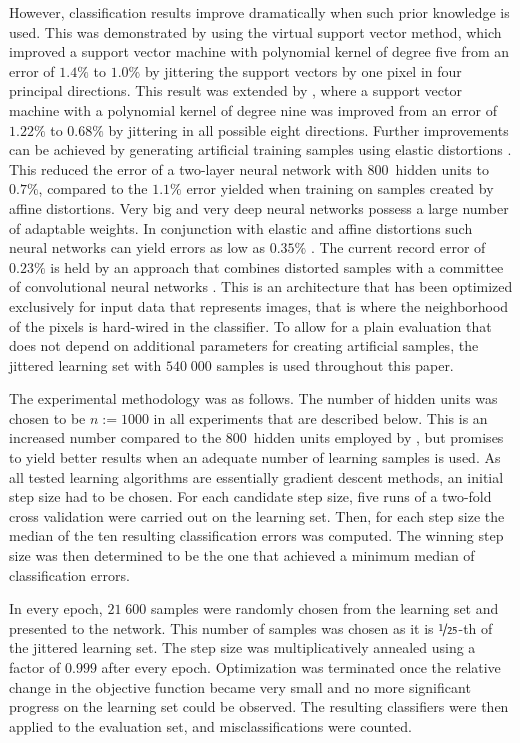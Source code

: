 \documentclass[twoside,11pt]{article}
\newcommand{\0}{\mathcal{O}}
\begin{document}
However, classification results improve dramatically when such prior knowledge is used.
This was demonstrated by \citet{Schoelkopf1997} using the virtual support vector method, which improved a support vector machine with polynomial kernel of degree five from an error of $1.4\%$ to $1.0\%$ by jittering the support vectors by one pixel in four principal directions.
This result was extended by \citet{DeCoste2002}, where a support vector machine with a polynomial kernel of degree nine was improved from an error of $1.22\%$ to $0.68\%$ by jittering in all possible eight directions.
Further improvements can be achieved by generating artificial training samples using elastic distortions \citep{Simard2003}.
This reduced the error of a two-layer neural network with $800$~hidden units to $0.7\%$, compared to the $1.1\%$ error yielded when training on samples created by affine distortions.
Very big and very deep neural networks possess a large number of adaptable weights.
In conjunction with elastic and affine distortions such neural networks can yield errors as low as $0.35\%$ \citep{Ciresan2010a}.
The current record error of $0.23\%$ is held by an approach that combines distorted samples with a committee of convolutional neural networks \citep{Ciresan2012a}.
This is an architecture that has been optimized exclusively for input data that represents images, that is where the neighborhood of the pixels is hard-wired in the classifier.
To allow for a plain evaluation that does not depend on additional parameters for creating artificial samples, the jittered learning set with $540\;000$ samples is used throughout this paper.

The experimental methodology was as follows.
The number of hidden units was chosen to be $n := 1000$ in all experiments that are described below.
This is an increased number compared to the $800$~hidden units employed by \citet{Simard2003}, but promises to yield better results when an adequate number of learning samples is used.
As all tested learning algorithms are essentially gradient descent methods, an initial step size had to be chosen.
For each candidate step size, five runs of a two-fold cross validation were carried out on the learning set.
Then, for each step size the median of the ten resulting classification errors was computed.
The winning step size was then determined to be the one that achieved a minimum median of classification errors.

In every epoch, $21\;600$ samples were randomly chosen from the learning set and presented to the network.
This number of samples was chosen as it is $\nicefrac{1}{25}$-th of the jittered learning set.
The step size was multiplicatively annealed using a factor of $0.999$ after every epoch.
Optimization was terminated once the relative change in the objective function became very small and no more significant progress on the learning set could be observed.
The resulting classifiers were then applied to the evaluation set, and misclassifications were counted.
\end{document}
